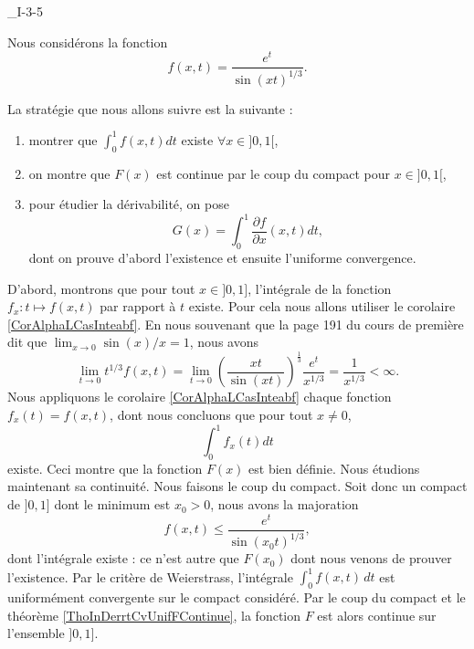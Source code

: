

\begin{corrige}{_I-3-5}

	Nous considérons la fonction
	\begin{equation}
		f(x,t)=\frac{  e^{t} }{  \sin(xt)^{1/3} }.
	\end{equation}

	La stratégie que nous allons suivre est la suivante :
	\begin{enumerate}
		\item montrer que $\int_{0}^1f(x,t)dt$ existe $\forall x\in]0,1[$,
		\item on montre que $F(x)$ est continue par le coup du compact pour $x\in]0,1[$,
		\item pour étudier la dérivabilité, on pose
		      \begin{equation}
			      G(x)=\int_0^1\frac{ \partial f }{ \partial x }(x,t)dt,
		      \end{equation}
		      dont on prouve d'abord l'existence et ensuite l'uniforme convergence.
	\end{enumerate}

	D'abord, montrons que pour tout $x\in ]0,1]$, l'intégrale de la fonction $f_x\colon t\mapsto f(x,t)$ par rapport à $t$ existe. Pour cela nous allons utiliser le corolaire \ref{CorAlphaLCasInteabf}. En nous souvenant que la page 191 du cours de première dit que $\lim_{x\to 0}\sin(x)/x=1$, nous avons
	\begin{equation}
		\lim_{t\to0}t^{1/3}f(x,t)=\lim_{t\to 0}\left( \frac{ xt }{ \sin(xt) } \right)^{\frac{ 1 }{ 3 }}\frac{ e^t }{ x^{1/3} }=\frac{1}{ x^{1/3} }<\infty.
	\end{equation}
	Nous appliquons le corolaire \ref{CorAlphaLCasInteabf} chaque fonction $f_x(t)=f(x,t)$, dont nous concluons que pour tout $x\neq 0$,
	\begin{equation}
		\int_0^1 f_x(t)dt
	\end{equation}
	existe. Ceci montre que la fonction $F(x)$ est bien définie. Nous étudions maintenant sa continuité. Nous faisons le coup du compact. Soit donc un compact de $]0,1]$ dont le minimum est $x_0>0$, nous avons la majoration
	\begin{equation}
		f(x,t)\leq\frac{ e^t }{ \sin(x_0t)^{1/3} },
	\end{equation}
	dont l'intégrale existe : ce n'est autre que $F(x_0)$ dont nous venons de prouver l'existence. Par le critère de Weierstrass, l'intégrale $\int_0^1f(x,t)\,dt$ est uniformément convergente sur le compact considéré. Par le coup du compact et le théorème \ref{ThoInDerrtCvUnifFContinue}, la fonction $F$ est alors continue sur l'ensemble $]0,1]$.


\end{corrige}
